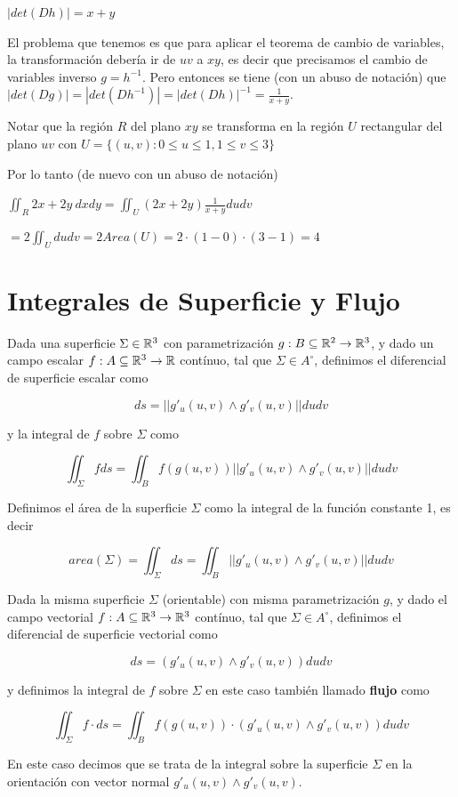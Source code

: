 $|det(Dh)| = x+y$

El problema que tenemos es que para aplicar el teorema de cambio de variables, la transformación debería ir de $uv$ a $xy$, es decir que precisamos el cambio de variables inverso $g = h^{-1}$.  Pero entonces se tiene (con un abuso de notación) que $|det(Dg)| = |det(Dh^{-1})| = |det(Dh)|^{-1} = \frac{1}{x+y}$.

Notar que la región $R$ del plano $xy$ se transforma en la región $U$ rectangular del plano $uv$ con $U = \{(u,v) : 0 \leq u \leq 1, 1 \leq v \leq 3 \}$

Por lo tanto (de nuevo con un abuso de notación)

$\iint_{R} 2x+2y \ dxdy = \iint_U (2x+2y) \frac{1}{x+y} dudv$

$= 2 \iint_U dudv = 2 Area(U) = 2 \cdot (1-0) \cdot (3-1) = 4$



\chapter{Integrales de Superficie y Flujo}

\begin{definition} 
Dada una superficie $\Sigma \in \mathbb{R}^3$ con parametrización $ g: B \subseteq \mathbb{R}^2 \to \mathbb{R}^3$, y dado un campo escalar $f : A \subseteq \mathbb{R}^3 \to \mathbb{R}$ contínuo, tal que $\Sigma \in A^{\circ}$, definimos el diferencial de superficie escalar como

$$ ds = || g'_u(u,v) \wedge g'_v(u,v) || dudv $$

y la integral de $f$ sobre $\Sigma$ como

$$ \iint_\Sigma f ds = \iint_B f(g(u,v)) || g'_u(u,v) \wedge g'_v(u,v) || dudv $$

Definimos el área de la superficie $\Sigma$ como la integral de la función constante 1, es decir

$$ area(\Sigma) = \iint_{\Sigma} ds = \iint_B || g'_u(u,v) \wedge g'_v(u,v) || dudv $$

Dada la misma superficie $\Sigma$ (orientable) con misma parametrización $g$, y dado el campo vectorial $f : A \subseteq \mathbb{R}^3 \to \mathbb{R}^3$ contínuo, tal que $\Sigma \in A^{\circ}$, definimos el diferencial de superficie vectorial como

$$ ds = ( g'_u(u,v) \wedge g'_v(u,v) ) dudv $$

y definimos la integral de $f$ sobre $\Sigma$ en este caso también llamado \textbf{flujo} como 

$$ \iint_\Sigma f \cdot ds = \iint_B f(g(u,v)) \cdot (g'_u(u,v) \wedge g'_v(u,v)) dudv $$

En este caso decimos que se trata de la integral sobre la superficie $\Sigma$ en la orientación con vector normal $g'_u(u,v) \wedge g'_v(u,v)$.
\end{definition}


